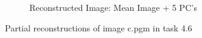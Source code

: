\documentclass[12pt]{article}
\begin{document}
\begin{figure}
\begin{subfigure}[b]{0.20\textwidth}
		\caption{Reconstructed Image: Mean Image + 5 PC's}
	\end{subfigure}\quad
	\caption[Plots of partial reconstructions of image c.pgm in task 4.6]{\label{fig:task4.6ReconstructedImages} Partial reconstructions of image c.pgm in task 4.6}
\end{figure}
\end{document}
